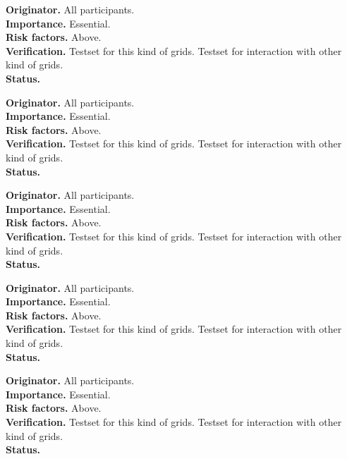\begin{reqlist}
{\bf Originator.} All participants. \\
{\bf Importance.} Essential. \\
{\bf Risk factors.} Above. \\
{\bf Verification.} Testset for this kind of grids. Testset for interaction 
with other kind of grids. \\
{\bf Status.} 
\end{reqlist}
\begin{reqlist}
{\bf Originator.} All participants. \\
{\bf Importance.} Essential. \\
{\bf Risk factors.} Above. \\
{\bf Verification.} Testset for this kind of grids. Testset for interaction 
with other kind of grids. \\
{\bf Status.} 
\end{reqlist} 
\begin{reqlist}
{\bf Originator.} All participants. \\
{\bf Importance.} Essential. \\
{\bf Risk factors.} Above. \\
{\bf Verification.} Testset for this kind of grids. Testset for interaction 
with other kind of grids. \\
{\bf Status.} 
\end{reqlist} 
\begin{reqlist}
{\bf Originator.} All participants. \\
{\bf Importance.} Essential. \\
{\bf Risk factors.} Above. \\
{\bf Verification.} Testset for this kind of grids. Testset for interaction 
with other kind of grids. \\
{\bf Status.} 
\end{reqlist} 
\begin{reqlist}
{\bf Originator.} All participants. \\
{\bf Importance.} Essential. \\
{\bf Risk factors.} Above. \\
{\bf Verification.} Testset for this kind of grids. Testset for interaction 
with other kind of grids. \\
{\bf Status.} 
\end{reqlist}
